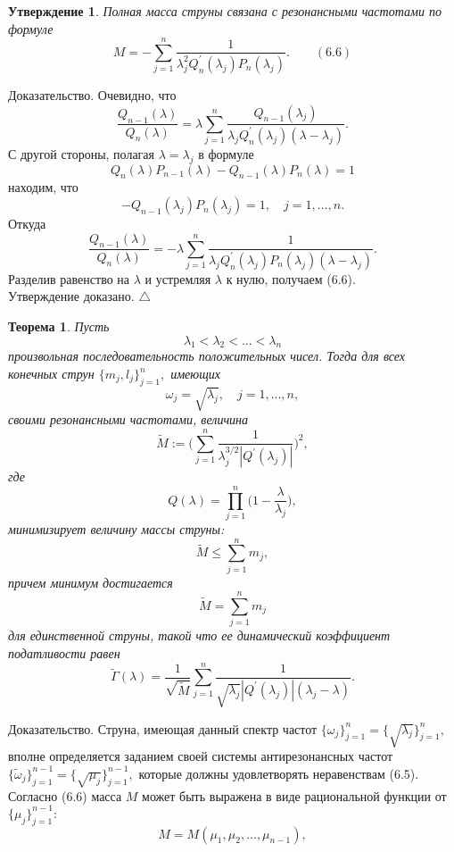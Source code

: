 \documentclass[12 pt, a4 paper]{article}
\theoremstyle{plain}   \newtheorem{Pro}{Задача}
\newtheorem{Sta}{Утверждение}
\newtheorem{The}{Теорема}
\begin{document}
\begin{Sta}
Полная масса струны связана с резонансными частотами
по формуле
$$
  M=-\sum _{j=1}^n \frac{1}
    {\lambda _j ^2 Q_n ^{\prime}(\lambda _j )
	  P_n (\lambda _j )}.
	    \qquad (6.6)
$$
\end{Sta}
{\Large Доказательство.}
Очевидно, что
$$
  \frac{Q_{n-1}(\lambda )}{Q_n (\lambda )}=
    \lambda \sum _{j=1}^n \frac{Q_{n-1}(\lambda _j )}
	  {\lambda _j Q_n ^{\prime}(\lambda _j ) (\lambda -\lambda _j )}.
$$
С другой стороны, полагая
$ \lambda = \lambda _j $
в формуле
$$
  Q_n (\lambda )P_{n-1}(\lambda )-
    Q_{n-1}(\lambda )P_n (\lambda ) =1
$$
находим, что
$$
  -Q_{n-1}(\lambda _j )P_n (\lambda _j )=1,
    \quad j=1,...,n.
$$
Откуда
$$
  \frac{Q_{n-1}(\lambda )}{Q_n (\lambda )}=-\lambda
    \sum _{j=1}^n \frac{1}
	  {\lambda _j Q_n ^{\prime}(\lambda _j )
	    P_n (\lambda _j )(\lambda -\lambda _j )}.
$$
Разделив равенство на
$ \lambda $
и устремляя
$ \lambda $
к нулю, получаем (6.6). \\
Утверждение доказано.
$ \triangle $
\begin{The}
Пусть
$$
  \lambda _1 < \lambda _2 < ...<\lambda _n
$$
произвольная последовательность положительных чисел.
Тогда для всех конечных струн
$ \{ m_j , l_j \} _{j=1}^n , $
имеющих
$$
  \omega _j =\sqrt{\lambda _j},
    \quad j=1,...,n,
$$
своими резонансными частотами, величина
$$
  \tilde M := \Biggl (
    \sum _{j=1}^n \frac{1}
	  {\lambda _j ^{3/2} |Q^{\prime}(\lambda _j ) | }
	    \Biggr ) ^2 ,
$$
где
$$
  Q(\lambda )=\prod _{j=1}^n \biggl ( 1-
    \frac{\lambda}{\lambda _j} \biggr ) ,
$$
минимизирует величину массы струны:
$$
  \tilde M \leqslant \sum _{j=1}^n m_j ,
$$
причем минимум достигается
$$
  \tilde M = \sum _{j=1}^n m_j
$$
для единственной струны, такой что ее динамический
коэффициент податливости равен
$$
  \tilde \Gamma (\lambda )=
    \frac{1}{\sqrt{\tilde M }} \sum _{j=1}^n
	  \frac{1}{\sqrt{\lambda _j}
	    |Q^{\prime}(\lambda _j ) | (\lambda _j -\lambda )}.
$$
\end{The}			   					
{\Large Доказательство.}
Струна, имеющая данный спектр частот
$ \{ \omega _j \} _{j=1}^n =\{ \sqrt{\lambda _j} \} _{j=1}^n , $
вполне определяется заданием своей системы антирезонансных частот
$ \{ \tilde \omega _j \} _{j=1}^{n-1}=\{ \sqrt{\mu _j} \} _{j=1}^{n-1} , $
которые должны удовлетворять неравенствам (6.5).
Согласно (6.6) масса
$ M $
может быть выражена в виде рациональной функции от
$ \{ \mu _j \} _{j=1}^{n-1} : $
$$
  M=M(\mu _1 , \mu _2 ,...,\mu _{n-1}),
$$
\end{document}
